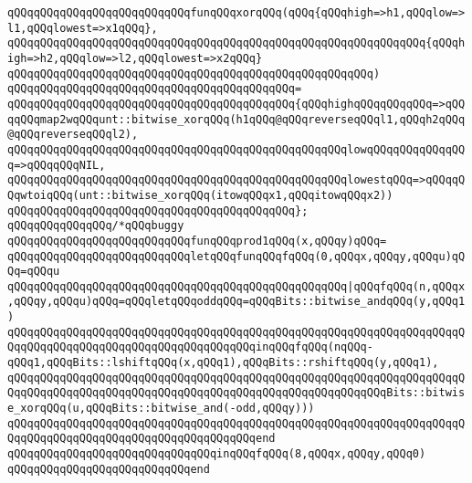 \newline
\verb|qQQqqQQqqQQqqQQqqQQqqQQqqQQqfunqQQqxorqQQq(qQQq{qQQqhigh=>h1,qQQqlow=>l1,qQQqlowest=>x1qQQq},|\newline
\verb|qQQqqQQqqQQqqQQqqQQqqQQqqQQqqQQqqQQqqQQqqQQqqQQqqQQqqQQqqQQqqQQq{qQQqhigh=>h2,qQQqlow=>l2,qQQqlowest=>x2qQQq}|\newline
\verb|qQQqqQQqqQQqqQQqqQQqqQQqqQQqqQQqqQQqqQQqqQQqqQQqqQQqqQQq)|\newline
\verb|qQQqqQQqqQQqqQQqqQQqqQQqqQQqqQQqqQQqqQQqqQQq=|\newline
\verb|qQQqqQQqqQQqqQQqqQQqqQQqqQQqqQQqqQQqqQQqqQQq{qQQqhighqQQqqQQqqQQq=>qQQqqQQqmap2wqQQqunt::bitwise_xorqQQq(h1qQQq@qQQqreverseqQQql1,qQQqh2qQQq@qQQqreverseqQQql2),|\newline
\verb|qQQqqQQqqQQqqQQqqQQqqQQqqQQqqQQqqQQqqQQqqQQqqQQqqQQqlowqQQqqQQqqQQqqQQq=>qQQqqQQqNIL,|\newline
\verb|qQQqqQQqqQQqqQQqqQQqqQQqqQQqqQQqqQQqqQQqqQQqqQQqqQQqlowestqQQq=>qQQqqQQqwtoiqQQq(unt::bitwise_xorqQQq(itowqQQqx1,qQQqitowqQQqx2))|\newline
\verb|qQQqqQQqqQQqqQQqqQQqqQQqqQQqqQQqqQQqqQQqqQQq};|\newline
\newline
\verb|qQQqqQQqqQQqqQQq/*qQQqbuggy|\newline
\verb|qQQqqQQqqQQqqQQqqQQqqQQqqQQqfunqQQqprod1qQQq(x,qQQqy)qQQq=|\newline
\verb|qQQqqQQqqQQqqQQqqQQqqQQqqQQqletqQQqfunqQQqfqQQq(0,qQQqx,qQQqy,qQQqu)qQQq=qQQqu|\newline
\verb|qQQqqQQqqQQqqQQqqQQqqQQqqQQqqQQqqQQqqQQqqQQqqQQqqQQq|\verb#|qQQqfqQQq(n,qQQqx,qQQqy,qQQqu)qQQq=qQQqletqQQqoddqQQq=qQQqBits::bitwise_andqQQq(y,qQQq1)#\newline
\verb|qQQqqQQqqQQqqQQqqQQqqQQqqQQqqQQqqQQqqQQqqQQqqQQqqQQqqQQqqQQqqQQqqQQqqQQqqQQqqQQqqQQqqQQqqQQqqQQqqQQqqQQqqQQqinqQQqfqQQq(nqQQq-qQQq1,qQQqBits::lshiftqQQq(x,qQQq1),qQQqBits::rshiftqQQq(y,qQQq1),|\newline
\verb|qQQqqQQqqQQqqQQqqQQqqQQqqQQqqQQqqQQqqQQqqQQqqQQqqQQqqQQqqQQqqQQqqQQqqQQqqQQqqQQqqQQqqQQqqQQqqQQqqQQqqQQqqQQqqQQqqQQqqQQqqQQqqQQqBits::bitwise_xorqQQq(u,qQQqBits::bitwise_and(-odd,qQQqy)))|\newline
\verb|qQQqqQQqqQQqqQQqqQQqqQQqqQQqqQQqqQQqqQQqqQQqqQQqqQQqqQQqqQQqqQQqqQQqqQQqqQQqqQQqqQQqqQQqqQQqqQQqqQQqqQQqqQQqend|\newline
\verb|qQQqqQQqqQQqqQQqqQQqqQQqqQQqqQQqinqQQqfqQQq(8,qQQqx,qQQqy,qQQq0)|\newline
\verb|qQQqqQQqqQQqqQQqqQQqqQQqqQQqend|\newline
